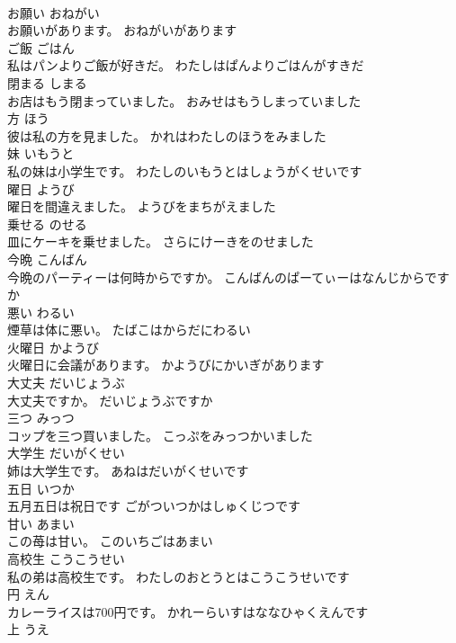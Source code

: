 \documentclass[8pt]{extreport}
\begin{document}
\begin{CJK}{UTF8}{min}
\\	お願い	おねがい	
\\	お願いがあります。	おねがいがあります	
\\	ご飯	ごはん	
\\	私はパンよりご飯が好きだ。	わたしはぱんよりごはんがすきだ	
\\	閉まる	しまる	
\\	お店はもう閉まっていました。	おみせはもうしまっていました	
\\	方	ほう	
\\	彼は私の方を見ました。	かれはわたしのほうをみました	
\\	妹	いもうと	
\\	私の妹は小学生です。	わたしのいもうとはしょうがくせいです	
\\	曜日	ようび	
\\	曜日を間違えました。	ようびをまちがえました	
\\	乗せる	のせる	
\\	皿にケーキを乗せました。	さらにけーきをのせました	
\\	今晩	こんばん	
\\	今晩のパーティーは何時からですか。	こんばんのぱーてぃーはなんじからですか	
\\	悪い	わるい	
\\	煙草は体に悪い。	たばこはからだにわるい	
\\	火曜日	かようび	
\\	火曜日に会議があります。	かようびにかいぎがあります	
\\	大丈夫	だいじょうぶ	
\\	大丈夫ですか。	だいじょうぶですか	
\\	三つ	みっつ	
\\	コップを三つ買いました。	こっぷをみっつかいました	
\\	大学生	だいがくせい	
\\	姉は大学生です。	あねはだいがくせいです	
\\	五日	いつか	
\\	五月五日は祝日です	ごがついつかはしゅくじつです	
\\	甘い	あまい	
\\	この苺は甘い。	このいちごはあまい	
\\	高校生	こうこうせい	
\\	私の弟は高校生です。	わたしのおとうとはこうこうせいです	
\\	円	えん	
\\	カレーライスは700円です。	かれーらいすはななひゃくえんです	
\\	上	うえ	

\end{CJK}
\end{document}
